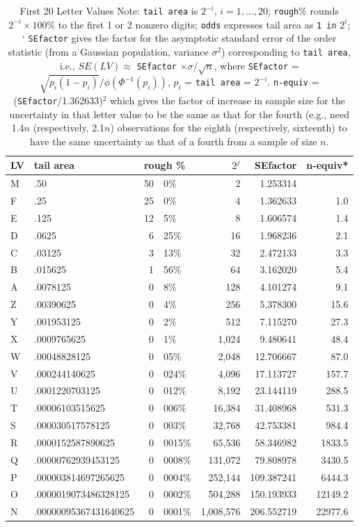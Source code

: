 \documentclass[oneside]{article}
\begin{document}
\begin{table}
\begin{tabular}{llr@{.}lrrr}\hline
LV & tail area & \multicolumn{2}{l}{rough \%} & $2^j$ & SEfactor & n-equiv*\\ \hline
 M & .50 & 50&0\% & 2 & 1.253314 \\
 F & .25 & 25& 0\% & 4 & 1.362633 & 1.0\\
 E & .125 & 12& 5\% & 8 & 1.606574 & 1.4\\
 D & .0625 & 6& 25\% & 16 & 1.968236 & 2.1\\
 C & .03125 & 3&13\% & 32 & 2.472133 & 3.3\\
 B & .015625 & 1&56\% & 64 & 3.162020 & 5.4\\
 A & .0078125 & 0&8\% & 128 & 4.101274 & 9.1\\
 Z & .00390625 & 0&4\% & 256 & 5.378300 & 15.6\\
 Y & .001953125 & 0&2\% & 512 & 7.115270 & 27.3\\
 X & .0009765625 & 0&1\% & 1,024 & 9.480641 & 48.4\\
 W & .00048828125 & 0&05\% & 2,048 & 12.706667 & 87.0  \\
 V & .000244140625 & 0&024\% & 4,096 & 17.113727 & 157.7\\
 U & .0001220703125 & 0&012\% & 8,192 & 23.144119 & 288.5\\
 T & .00006103515625 & 0&006\% & 16,384 & 31.408968 & 531.3\\
 S & .000030517578125 & 0&003\% & 32,768 & 42.753381 & 984.4\\
 R & .0000152587890625 & 0&0015\% & 65,536 & 58.346982 & 1833.5\\
 Q & .00000762939453125 & 0&0008\% & 131,072 & 79.808978 & 3430.5\\
 P & .000003814697265625 & 0&0004\% & 252,144 & 109.387241 & 6444.3\\
 O & .0000019073486328125 & 0&0002\% & 504,288 & 150.193933 & 12149.2\\
 N & .00000095367431640625 & 0&0001\% &1,008,576 & 206.552719 & 22977.6\\\hline
\end{tabular}
\caption{First 20 Letter Values \newline
{\small Note: \texttt{tail area} is $2 ^{-i}$, $i = 1, ..., 20$; 
\texttt{rough}\% rounds $2 ^{-i} \times 100$\%
   to the first 1 or 2 nonzero digits; 
\texttt{odds} expresses tail area as \texttt{1 in} $2^i$; `
\texttt{SEfactor} gives the factor for the asymptotic standard error
of the order statistic (from a Gaussian population, variance $\sigma^2$) 
corresponding to \texttt{tail area}, i.e., 
  $SE(LV) \approx$ \texttt{SEfactor} $\times \sigma / \sqrt{n}$,
where \texttt{SEfactor} = $\sqrt{p_i (1-p_i)} / \phi(\Phi^{-1}(p_i))$,
$p_i$ = \texttt{tail area} = $2^{-i}$.
\texttt{n-equiv} = (\texttt{SEfactor}/1.362633)$^2$ which gives
the factor of increase in sample size for the uncertainty in
that letter value to be the same as that for the fourth
(e.g., need 1.4$n$ (respectively, 2.1$n$) observations for the 
eighth (respectively, sixteenth) to have 
the same uncertainty as that of a fourth from a sample of size $n$.
}}
\end{table}
\end{document}
